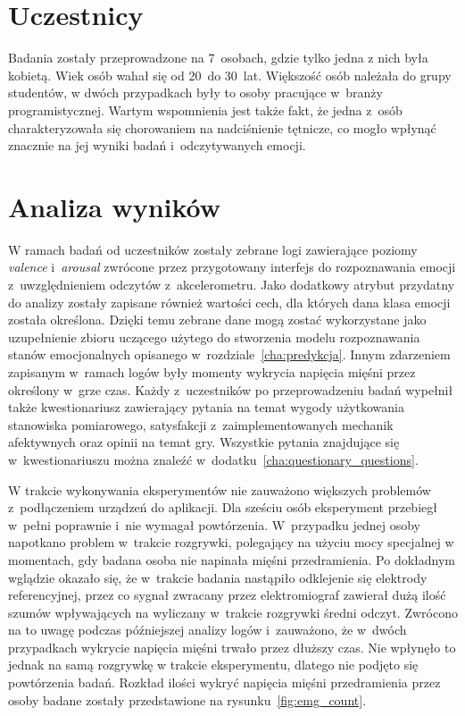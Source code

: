 \section{Uczestnicy}
Badania zostały przeprowadzone na 7~osobach, gdzie tylko jedna z nich była kobietą. Wiek osób wahał się od 20~do 30~lat. Większość osób należała do grupy studentów, w dwóch przypadkach były to osoby pracujące w~branży programistycznej. Wartym wspomnienia jest także fakt, że jedna z~osób charakteryzowała się chorowaniem na nadciśnienie tętnicze, co mogło wpłynąć znacznie na jej wyniki badań i~odczytywanych emocji.
\section{Analiza wyników}
W ramach badań od uczestników zostały zebrane logi zawierające poziomy \textit{valence} i~\textit{arousal} zwrócone przez przygotowany interfejs do rozpoznawania emocji z~uwzględnieniem odczytów z~akcelerometru. Jako dodatkowy atrybut przydatny do analizy zostały zapisane również wartości cech, dla których dana klasa emocji została określona. Dzięki temu zebrane dane mogą zostać wykorzystane jako uzupełnienie zbioru uczącego użytego do stworzenia modelu rozpoznawania stanów emocjonalnych opisanego w~rozdziale~\ref{cha:predykcja}. Innym zdarzeniem zapisanym w~ramach logów były momenty wykrycia napięcia mięśni przez określony w~grze czas. Każdy z~uczestników po przeprowadzeniu badań wypełnił także kwestionariusz zawierający pytania na temat wygody użytkowania stanowiska pomiarowego, satysfakcji z~zaimplementowanych mechanik afektywnych oraz opinii na temat gry. Wszystkie pytania znajdujące się w~kwestionariuszu można znaleźć w~dodatku~\ref{cha:questionary_questions}.

W trakcie wykonywania eksperymentów nie zauważono większych problemów z~podłączeniem urządzeń do aplikacji. Dla sześciu osób eksperyment przebiegł w~pełni poprawnie i~nie wymagał powtórzenia. W~przypadku jednej osoby napotkano problem w~trakcie rozgrywki, polegający na użyciu mocy specjalnej w momentach, gdy badana osoba nie napinała mięśni przedramienia. Po dokładnym wglądzie okazało się, że w~trakcie badania nastąpiło odklejenie się elektrody referencyjnej, przez co sygnał zwracany przez elektromiograf zawierał dużą ilość szumów wpływających na wyliczany w~trakcie rozgrywki średni odczyt. Zwrócono na to uwagę podczas późniejszej analizy logów i~zauważono, że w~dwóch przypadkach wykrycie napięcia mięśni trwało przez dłuższy czas. Nie wpłynęło to jednak na samą rozgrywkę w trakcie eksperymentu, dlatego nie podjęto się powtórzenia badań. Rozkład ilości wykryć napięcia mięśni przedramienia przez osoby badane zostały przedstawione na rysunku~\ref{fig:emg_count}.

